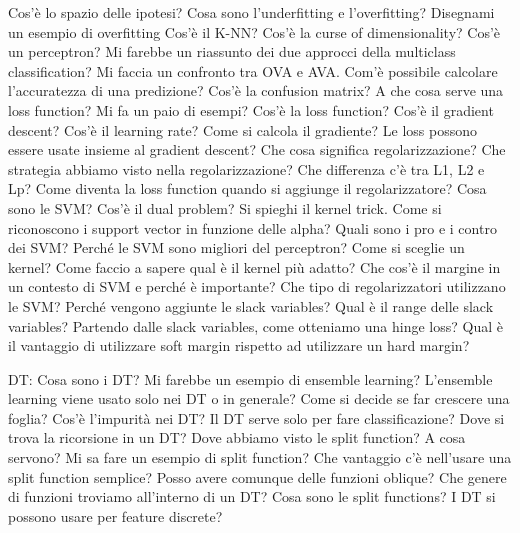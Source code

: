 Cos'è lo spazio delle ipotesi?
Cosa sono l'underfitting e l'overfitting?
Disegnami un esempio di overfitting
Cos'è il K-NN? Cos'è la curse of dimensionality?
Cos'è un perceptron?
Mi farebbe un riassunto dei due approcci della multiclass classification?
Mi faccia un confronto tra OVA e AVA.
Com'è possibile calcolare l'accuratezza di una predizione?
Cos'è la confusion matrix?
A che cosa serve una loss function? Mi fa un paio di esempi?
Cos'è la loss function?
Cos'è il gradient descent? Cos'è il learning rate?
Come si calcola il gradiente?
Le loss possono essere usate insieme al gradient descent?
Che cosa significa regolarizzazione? Che strategia abbiamo visto nella regolarizzazione?
Che differenza c'è tra L1, L2 e Lp?
Come diventa la loss function quando si aggiunge il regolarizzatore?
Cosa sono le SVM?
Cos'è il dual problem?
Si spieghi il kernel trick.
Come si riconoscono i support vector in funzione delle alpha?
Quali sono i pro e i contro dei SVM?
Perché le SVM sono migliori del perceptron?
Come si sceglie un kernel? Come faccio a sapere qual è il kernel più adatto?
Che cos'è il margine in un contesto di SVM e perché è importante?
Che tipo di regolarizzatori utilizzano le SVM?
Perché vengono aggiunte le slack variables?
Qual è il range delle slack variables?
Partendo dalle slack variables, come otteniamo una hinge loss?
Qual è il vantaggio di utilizzare soft margin rispetto ad utilizzare un hard margin?

DT:
Cosa sono i DT?
Mi farebbe un esempio di ensemble learning?
L'ensemble learning viene usato solo nei DT o in generale?
Come si decide se far crescere una foglia?
Cos'è l'impurità nei DT?
Il DT serve solo per fare classificazione?
Dove si trova la ricorsione in un DT?
Dove abbiamo visto le split function? A cosa servono? Mi sa fare un esempio di split function? Che vantaggio c'è nell'usare una split function semplice? Posso avere comunque delle funzioni oblique?
Che genere di funzioni troviamo all'interno di un DT?
Cosa sono le split functions?
I DT si possono usare per feature discrete?

